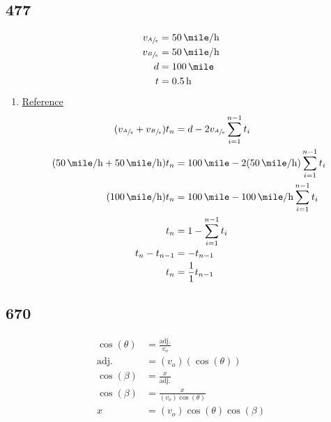 \documentclass{article}
\begin{document}
\subsection{477}
\begin{align*}
	v_{\sfrac{A}{e}} & = \SI{50}{\mile \per \hour} \\
	v_{\sfrac{B}{e}} & = \SI{50}{\mile \per \hour} \\
	d & = \SI{100}{\mile} \\
	t & = \SI{0.5}{\hour}
\end{align*}
\begin{enumerate}[label=\textbf{(\alph*)}]
	\item
		\href{https://math.stackexchange.com/a/895981}{Reference}
		\begin{align*}
			(v_{\sfrac{A}{e}} + v_{\sfrac{B}{e}})t_n & = d - 2v_{\sfrac{A}{e}} \sum_{i = 1}^{n - 1} t_i \\
			(\SI{50}{\mile \per \hour} + \SI{50}{\mile \per \hour})t_n & = \SI{100}{\mile} - 2(\SI{50}{\mile \per \hour}) \sum_{i = 1}^{n - 1} t_i \\
			(\SI{100}{\mile \per \hour})t_n & = \SI{100}{\mile} - \SI{100}{\mile \per \hour} \sum_{i = 1}^{n - 1} t_i \\
			t_n & = 1 - \sum_{i = 1}^{n - 1} t_i \\
			t_n - t_{n - 1} & = -t_{n - 1} \\
			t_n & = \frac{1}{1}t_{n - 1}
		\end{align*}
\end{enumerate}

\subsection{670}
\begin{align*}
	\cos(\theta) & = \frac{\text{adj.}}{v_o} \\
	\text{adj.} & = (v_o)(\cos(\theta)) \\
	\cos(\beta) & = \frac{x}{\text{adj.}} \\
	\cos(\beta) & = \frac{x}{(v_o)\cos(\theta)} \\
	x & = (v_o)\cos(\theta)\cos(\beta)
\end{align*}
\end{document}
